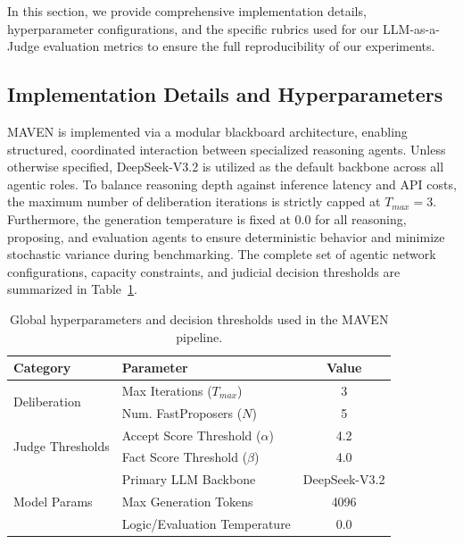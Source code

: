 \documentclass{article}
\begin{document}
In this section, we provide comprehensive implementation details, hyperparameter configurations, and the specific rubrics used for our LLM-as-a-Judge evaluation metrics to ensure the full reproducibility of our experiments.

\subsection{Implementation Details and Hyperparameters}
MAVEN is implemented via a modular blackboard architecture, enabling structured, coordinated interaction between specialized reasoning agents. Unless otherwise specified, DeepSeek-V3.2 is utilized as the default backbone across all agentic roles. To balance reasoning depth against inference latency and API costs, the maximum number of deliberation iterations is strictly capped at $T_{max}=3$. Furthermore, the generation temperature is fixed at $0.0$ for all reasoning, proposing, and evaluation agents to ensure deterministic behavior and minimize stochastic variance during benchmarking. The complete set of agentic network configurations, capacity constraints, and judicial decision thresholds are summarized in Table~\ref{tab:hyperparams_appendix}.

\begin{table}[h]
  \caption{Global hyperparameters and decision thresholds used in the MAVEN pipeline.}
  \label{tab:hyperparams_appendix}
  \centering 
  \begin{tabular}{llc} 
    \toprule
    \textbf{Category} & \textbf{Parameter} & \textbf{Value} \\
    \midrule
    \multirow{2}{*}{Deliberation} & Max Iterations ($T_{max}$) & 3 \\
                                  & Num. FastProposers ($N$) & 5 \\
    \midrule
    \multirow{2}{*}{Judge Thresholds} & Accept Score Threshold ($\alpha$) & 4.2 \\
                                      & Fact Score Threshold ($\beta$) & 4.0 \\
    \midrule
    \multirow{3}{*}{Model Params} & Primary LLM Backbone & DeepSeek-V3.2 \\
                                  & Max Generation Tokens & 4096 \\
                                  & Logic/Evaluation Temperature & 0.0 \\
    \bottomrule
  \end{tabular}
\end{table}
\end{document}

